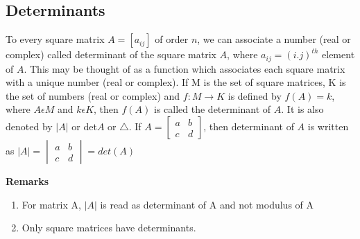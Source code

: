 \documentclass{article}
\begin{document}
\subsection{Determinants}
To every square matrix $A=[a_{ij}]$ of order $n$, we can associate a number (real or
complex) called determinant of the square matrix $A$, where $a_{ij}=(i.j)^{th}$ element of $A$. This may be thought of as a function which associates each square matrix with a unique number (real or complex). If M is the set of square matrices, K is the set of numbers (real or complex) and $f:M\xrightarrow{}K$ is defined by $f(A)=k$, where $A\epsilon M$ and  $k\epsilon K$, then $f(A)$ is called the determinant of $A$. It is also denoted by $|A|$ or det$A$ or $\triangle$.
If $A=\begin{bmatrix}
    a & b \\
    c & d
\end{bmatrix}$, then determinant of $A$ is written as $|A|= \begin{vmatrix} a & b \\
c & d 
\end{vmatrix} = det(A)$

\textbf{Remarks}
\begin{enumerate}[label=\roman*.]
\item For matrix A, $|A|$ is read as determinant of A and not modulus of A
\item Only square matrices have determinants.
\end{enumerate}
\end{document}
